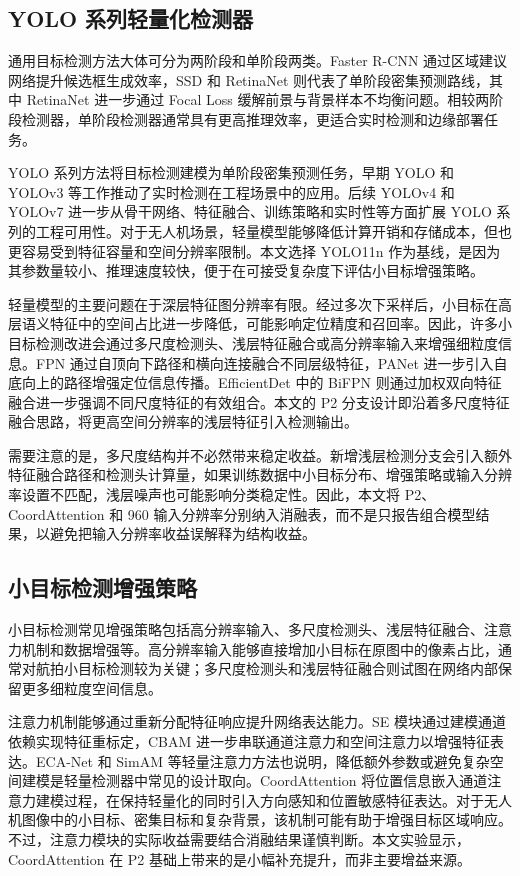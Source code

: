 \documentclass[UTF8,a4paper,10.5pt,fontset=windows]{ctexart}
\newcommand{\YOLOBase}{\mbox{YOLO11n}}
\newcommand{\CoordAtt}{\mbox{CoordAttention}}
\begin{document}
\subsection{YOLO 系列轻量化检测器}

通用目标检测方法大体可分为两阶段和单阶段两类。Faster R-CNN 通过区域建议网络提升候选框生成效率，SSD 和 RetinaNet 则代表了单阶段密集预测路线，其中 RetinaNet 进一步通过 Focal Loss 缓解前景与背景样本不均衡问题\cite{ren2015fasterrcnn,liu2016ssd,lin2017retinanet}。相较两阶段检测器，单阶段检测器通常具有更高推理效率，更适合实时检测和边缘部署任务。

YOLO 系列方法将目标检测建模为单阶段密集预测任务，早期 YOLO 和 YOLOv3 等工作推动了实时检测在工程场景中的应用\cite{redmon2016yolo,redmon2018yolov3}。后续 YOLOv4 和 YOLOv7 进一步从骨干网络、特征融合、训练策略和实时性等方面扩展 YOLO 系列的工程可用性\cite{bochkovskiy2020yolov4,wang2022yolov7}。对于无人机场景，轻量模型能够降低计算开销和存储成本，但也更容易受到特征容量和空间分辨率限制。本文选择 \YOLOBase{} 作为基线，是因为其参数量较小、推理速度较快，便于在可接受复杂度下评估小目标增强策略。

轻量模型的主要问题在于深层特征图分辨率有限。经过多次下采样后，小目标在高层语义特征中的空间占比进一步降低，可能影响定位精度和召回率。因此，许多小目标检测改进会通过多尺度检测头、浅层特征融合或高分辨率输入来增强细粒度信息。FPN 通过自顶向下路径和横向连接融合不同层级特征，PANet 进一步引入自底向上的路径增强定位信息传播\cite{lin2017fpn,liu2018panet}。EfficientDet 中的 BiFPN 则通过加权双向特征融合进一步强调不同尺度特征的有效组合\cite{tan2020efficientdet}。本文的 P2 分支设计即沿着多尺度特征融合思路，将更高空间分辨率的浅层特征引入检测输出。

需要注意的是，多尺度结构并不必然带来稳定收益。新增浅层检测分支会引入额外特征融合路径和检测头计算量，如果训练数据中小目标分布、增强策略或输入分辨率设置不匹配，浅层噪声也可能影响分类稳定性。因此，本文将 P2、\CoordAtt{} 和 960 输入分辨率分别纳入消融表，而不是只报告组合模型结果，以避免把输入分辨率收益误解释为结构收益。

\subsection{小目标检测增强策略}

小目标检测常见增强策略包括高分辨率输入、多尺度检测头、浅层特征融合、注意力机制和数据增强等。高分辨率输入能够直接增加小目标在原图中的像素占比，通常对航拍小目标检测较为关键；多尺度检测头和浅层特征融合则试图在网络内部保留更多细粒度空间信息。

注意力机制能够通过重新分配特征响应提升网络表达能力。SE 模块通过建模通道依赖实现特征重标定，CBAM 进一步串联通道注意力和空间注意力以增强特征表达\cite{hu2018senet,woo2018cbam}。ECA-Net 和 SimAM 等轻量注意力方法也说明，降低额外参数或避免复杂空间建模是轻量检测器中常见的设计取向\cite{wang2020eca,yang2021simam}。\CoordAtt{} 将位置信息嵌入通道注意力建模过程，在保持轻量化的同时引入方向感知和位置敏感特征表达\cite{hou2021coordinate}。对于无人机图像中的小目标、密集目标和复杂背景，该机制可能有助于增强目标区域响应。不过，注意力模块的实际收益需要结合消融结果谨慎判断。本文实验显示，\CoordAtt{} 在 P2 基础上带来的是小幅补充提升，而非主要增益来源。
\end{document}
